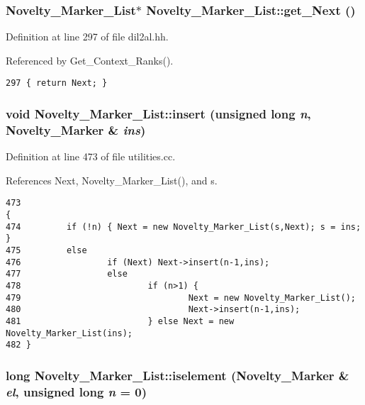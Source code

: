 \subsubsection{\setlength{\rightskip}{0pt plus 5cm}Novelty\_\-Marker\_\-List$\ast$ Novelty\_\-Marker\_\-List::get\_\-Next ()\hspace{0.3cm}{\tt  [inline]}}\label{classNovelty__Marker__List_a5}




Definition at line 297 of file dil2al.hh.

Referenced by Get\_\-Context\_\-Ranks().



\footnotesize\begin{verbatim}297 { return Next; }
\end{verbatim}\normalsize 
{}
\subsubsection{\setlength{\rightskip}{0pt plus 5cm}void Novelty\_\-Marker\_\-List::insert (unsigned long {\em n}, {\bf Novelty\_\-Marker} \& {\em ins})}\label{classNovelty__Marker__List_a7}




Definition at line 473 of file utilities.cc.

References Next, Novelty\_\-Marker\_\-List(), and s.



\footnotesize\begin{verbatim}473                                                                       {
474         if (!n) { Next = new Novelty_Marker_List(s,Next); s = ins; }
475         else
476                 if (Next) Next->insert(n-1,ins);
477                 else 
478                         if (n>1) {
479                                 Next = new Novelty_Marker_List();
480                                 Next->insert(n-1,ins);
481                         } else Next = new Novelty_Marker_List(ins);
482 }
\end{verbatim}\normalsize 
{}
\subsubsection{\setlength{\rightskip}{0pt plus 5cm}long Novelty\_\-Marker\_\-List::iselement ({\bf Novelty\_\-Marker} \& {\em el}, unsigned long {\em n} = 0)}\label{classNovelty__Marker__List_a9}




